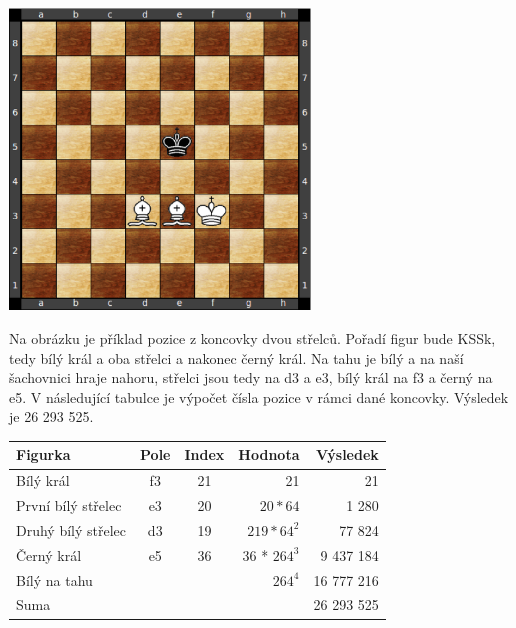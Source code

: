 \documentclass[11pt, titlepage]{article}
\begin{document}
\begin{center}
	\includegraphics[width=8cm, height=8cm]{diagram2.ps}
\end{center}

Na obrázku je příklad pozice z koncovky dvou střelců. Pořadí figur bude KSSk, tedy bílý král a oba střelci a nakonec černý král. Na tahu je bílý a na naší šachovnici hraje nahoru, střelci jsou tedy na d3 a e3, bílý král na f3 a černý na e5. V následující tabulce je výpočet čísla pozice v rámci dané koncovky. Výsledek je 26 293 525.

\vskip 0.5cm
\noindent
\begin{tabular}{|l|c|c|r|r|}
\hline
	{\bf Figurka} & {\bf Pole} & {\bf Index} & {\bf Hodnota} & {\bf Výsledek} \\
\hline
	Bílý král & f3 & 21 & 21 & 21 \\
\hline
	První bílý střelec & e3 & 20 & \begin{math}20 * 64\end{math} & 1 280 \\
\hline
	Druhý bílý střelec & d3 & 19 & \begin{math}219 * 64^2\end{math}	& 77 824 \\
\hline
	Černý král & e5 & 36 & 36 * \begin{math}264^3\end{math} & 9 437 184 \\
\hline
	\multicolumn{3}{|l|}{Bílý na tahu} & \begin{math}264^4\end{math} & 16 777 216 \\
\hline
	\multicolumn{4}{|l|}{Suma} & 26 293 525 \\
\hline
\end{tabular}
\vskip 0.5cm
\end{document}
